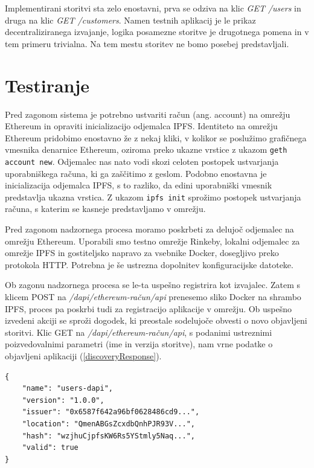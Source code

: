 \documentclass[a4paper, 12pt]{book}
\begin{document}
Implementirani storitvi sta zelo enostavni, prva se odziva na klic \textit{GET /users} in druga na klic \textit{GET /customers}.
Namen testnih aplikacij je le prikaz decentraliziranega izvajanje, logika posamezne storitve je drugotnega pomena in v tem primeru trivialna.
Na tem mestu storitev ne bomo posebej predstavljali.

\section{Testiranje}
Pred zagonom sistema je potrebno ustvariti račun (ang. account) na omrežju Ethereum in opraviti inicializacijo odjemalca IPFS.
Identiteto na omrežju Ethereum pridobimo enostavno že z nekaj kliki, v kolikor se poslužimo gra\-fi\-čne\-ga vmesnika denarnice Ethereum, oziroma preko ukazne vrstice z ukazom \texttt{geth account new}.
Odjemalec nas nato vodi skozi celoten postopek ustvarjanja uporabniškega računa, ki ga zaščitimo z geslom.
Podobno enostavna je inicializacija odjemalca IPFS, s to razliko, da edini uporabniški vmesnik predstavlja ukazna vrstica.
Z ukazom \texttt{ipfs init} sprožimo postopek ustvarjanja računa, s katerim se kasneje predstavljamo v omrežju.

Pred zagonom nadzornega procesa moramo poskrbeti za delujoč odjemalec na omrežju Ethereum. Uporabili smo testno omrežje Rinkeby, lokalni odjemalec za omrežje IPFS in gostiteljsko napravo za vsebnike Docker, dosegljivo preko protokola HTTP.
Potrebna je še ustrezna dopolnitev konfiguracijske datoteke.

Ob zagonu nadzornega procesa se le-ta uspešno registrira kot izvajalec.
Zatem s klicem POST na \textit{/dapi/{ethereum-račun}/api} prenesemo sliko Docker na shrambo IPFS, proces pa poskrbi tudi za registracijo aplikacije v omrežju.
Ob uspešno izvedeni akciji se sproži dogodek, ki preostale sodelujoče obvesti o novo objavljeni storitvi.
Klic GET na \textit{/dapi/{ethereum-račun}/api}, s podanimi ustreznimi poizvedovalnimi parametri (ime in verzija storitve), nam vrne podatke o objavljeni aplikaciji (\ref{discoveryResponse}).

\begin{lstlisting}[caption={Odziv storitve ob uspešno odkriti registrirani aplikaciji},captionpos=b,label={discoveryResponse}]
{
	"name": "users-dapi",
	"version": "1.0.0",
	"issuer": "0x6587f642a96bf0628486cd9...",
	"location": "QmenABGsZcxdbQnhPJR93V...",
	"hash": "wzjhuCjpfsKW6Rs5YStmly5Naq...",
	"valid": true
}	
\end{lstlisting}
\end{document}
